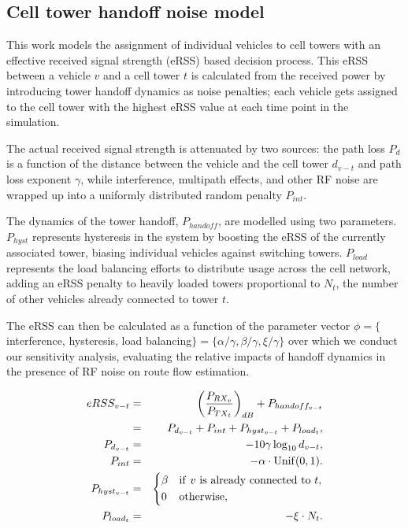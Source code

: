 \subsection{Cell tower handoff noise model}
\label{sec:handoff-model}

This work models the assignment of individual vehicles to cell towers with an effective received signal strength (eRSS) based decision process.  This eRSS between a vehicle $v$ and a cell tower $t$ is calculated from the received power by introducing tower handoff dynamics as noise penalties;
each vehicle gets assigned to the cell tower with the highest eRSS value at each time point in the simulation.

The actual received signal strength is attenuated by two sources: the path loss $P_d$ is a function of the distance between the vehicle and the cell tower $d_{v-t}$ and path loss exponent $\gamma$, while 
interference, multipath effects, and other RF noise are wrapped up into a uniformly distributed random penalty $P_{int}$.

The dynamics of the tower handoff, $P_{handoff}$, are modelled using two parameters.  $P_{hyst}$ represents hysteresis in the system by boosting the eRSS of the currently associated tower, biasing individual vehicles against switching towers.  $P_{load}$ represents the load balancing efforts to distribute usage across the cell network, adding an eRSS penalty to heavily loaded towers proportional to $N_t$, the number of other vehicles already connected to tower $t$.  

The eRSS can then be calculated as a function of the parameter vector $\phi = \{$interference, hysteresis, load balancing$\} = \{\alpha/\gamma, \beta/\gamma, \xi/\gamma\}$ over which we conduct our sensitivity analysis, evaluating the relative impacts of handoff dynamics in the presence of RF noise on route flow estimation.

\begin{eqnarray}
  eRSS_{v-t} & = & \left( \frac{P_{RX_v}}{P_{TX_t}} \right)_{dB} 
                   + P_{handoff_{v-t}} \\
  & = & P_{d_{v-t}} +P_{int} + P_{hyst_{v-t}} + P_{load_t}, \\
  P_{d_{v-t}} & = & -10 \gamma \log_{10} d_{v-t}, \\
  P_{int} & = & -\alpha \cdot \mathrm{Unif}(0,1). \\
  P_{hyst_{v-t}} & = & \begin{dcases}
    \beta & \mathrm{if~} v \mathrm{~is~already~connected~to~} t, \\
    0 & \mathrm{otherwise,}
  \end{dcases} \\
  P_{load_t} & = & -\xi \cdot N_{t}.
\end{eqnarray}

